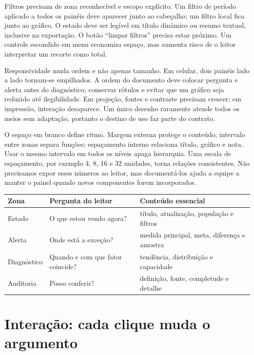 Filtros precisam de zona reconhecível e escopo explícito. Um filtro de período aplicado a todos os painéis deve aparecer junto ao cabeçalho; um filtro local fica junto ao gráfico. O estado deve ser legível em título dinâmico ou resumo textual, inclusive na exportação. O botão ``limpar filtros'' precisa estar próximo. Um controle escondido em menu economiza espaço, mas aumenta risco de o leitor interpretar um recorte como total.

Responsividade muda ordem e não apenas tamanho. Em celular, dois painéis lado a lado tornam-se empilhados. A ordem do documento deve colocar pergunta e alerta antes do diagnóstico, conservar rótulos e evitar que um gráfico seja reduzido até ilegibilidade. Em projeção, fontes e contraste precisam crescer; em impressão, interação desaparece. Um único desenho raramente atende todos os meios sem adaptação, portanto o destino de uso faz parte do contrato.

O espaço em branco define ritmo. Margem externa protege o conteúdo; intervalo entre zonas separa funções; espaçamento interno relaciona título, gráfico e nota. Usar o mesmo intervalo em todos os níveis apaga hierarquia. Uma escala de espaçamento, por exemplo 4, 8, 16 e 32 unidades, torna relações consistentes. Não precisamos expor esses números ao leitor, mas documentá-los ajuda a equipe a manter o painel quando novos componentes forem incorporados.

\begin{center}
\begin{tabularx}{\textwidth}{p{2.8cm}Y Y}
\toprule
Zona & Pergunta do leitor & Conteúdo essencial \\
\midrule
Estado & O que estou vendo agora? & título, atualização, população e filtros \\
Alerta & Onde está a exceção? & medida principal, meta, diferença e amostra \\
Diagnóstico & Quando e com que fator coincide? & tendência, distribuição e capacidade \\
Auditoria & Posso conferir? & definição, fonte, completude e detalhe \\
\bottomrule
\end{tabularx}
\end{center}

\section{Interação: cada clique muda o argumento}

